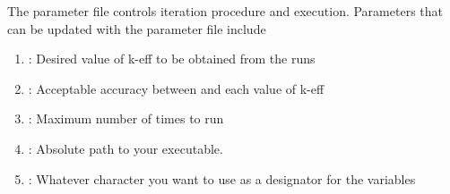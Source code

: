 \documentclass[letterpaper,10pt,english]{sphinxmanual}
\begin{document}
\begin{sphinxVerbatim}[commandchars=\\\{\}]
    \PYG{p}{[}\PYG{p}{]} \PYG{p}{[} \PYG{p}{]}

 
                   
                  

 
                    
                   
     
                            
\end{sphinxVerbatim}

The parameter file controls iteration procedure and  execution.
Parameters that can be updated with the parameter file include
\begin{enumerate}
\item {} 
: Desired value of k-eff to be obtained from the  runs

\item {} 
: Acceptable accuracy between  and each value of k-eff

\item {} 
: Maximum number of times to run 

\item {} 
: Absolute path to your  executable.

\item {} 
: Whatever character you want to use as a designator for the variables

\end{enumerate}
\end{document}
